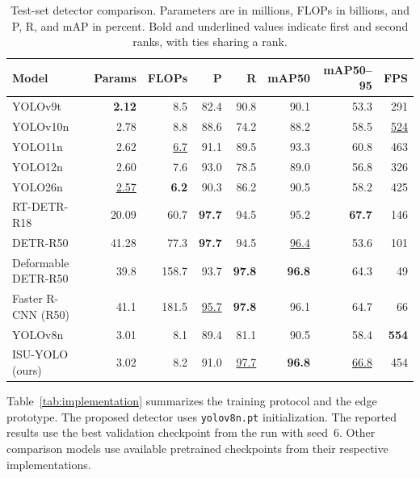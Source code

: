 \documentclass[lettersize,journal]{IEEEtran}
\begin{document}
\begin{table}[!t]
\caption{Test-set detector comparison. Parameters are in millions, FLOPs in billions, and P, R, and mAP in percent. Bold and underlined values indicate first and second ranks, with ties sharing a rank.}
\label{tab:comparison}
\centering
\small
\setlength{\tabcolsep}{4pt}
\renewcommand{\arraystretch}{1.06}
\begin{tabular*}{\textwidth}{@{\extracolsep{\fill}}lrrrrrrr@{}}
\toprule
Model & Params & FLOPs & P & R & mAP50 & mAP50--95 & FPS \\
\midrule
YOLOv9t~\cite{wang2025yolov9} & \textbf{2.12} & 8.5 & 82.4 & 90.8 & 90.1 & 53.3 & 291 \\
YOLOv10n~\cite{wang2024yolov10} & 2.78 & 8.8 & 88.6 & 74.2 & 88.2 & 58.5 & \underline{524} \\
YOLO11n~\cite{ultralytics2023} & 2.62 & \underline{6.7} & 91.1 & 89.5 & 93.3 & 60.8 & 463 \\
YOLO12n~\cite{tian2025yolov12} & 2.60 & 7.6 & 93.0 & 78.5 & 89.0 & 56.8 & 326 \\
YOLO26n~\cite{ultralytics2023} & \underline{2.57} & \textbf{6.2} & 90.3 & 86.2 & 90.5 & 58.2 & 425 \\
RT-DETR-R18~\cite{zhao2024rtdetr} & 20.09 & 60.7 & \textbf{97.7} & 94.5 & 95.2 & \textbf{67.7} & 146 \\
DETR-R50~\cite{carion2020detr} & 41.28 & 77.3 & \textbf{97.7} & 94.5 & \underline{96.4} & 53.6 & 101 \\
Deformable DETR-R50~\cite{zhu2021deformable} & 39.8 & 158.7 & 93.7 & \textbf{97.8} & \textbf{96.8} & 64.3 & 49 \\
Faster R-CNN (R50)~\cite{ren2015faster} & 41.1 & 181.5 & \underline{95.7} & \textbf{97.8} & 96.1 & 64.7 & 66 \\
YOLOv8n~\cite{ultralytics2023} & 3.01 & 8.1 & 89.4 & 81.1 & 90.5 & 58.4 & \textbf{554} \\
ISU-YOLO (ours) & 3.02 & 8.2 & 91.0 & \underline{97.7} & \textbf{96.8} & \underline{66.8} & 454 \\
\bottomrule
\end{tabular*}
\par\smallskip
\renewcommand{\arraystretch}{1.0}
\end{table}

Table~\ref{tab:implementation} summarizes the training protocol and the edge prototype. The proposed detector uses \texttt{yolov8n.pt} initialization. The reported results use the best validation checkpoint from the run with seed~6. Other comparison models use available pretrained checkpoints from their respective implementations.
\end{document}
